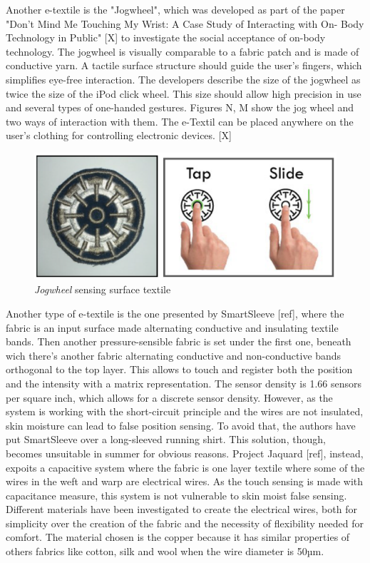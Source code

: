 \documentclass{sigchi}
\begin{document}
Another e-textile is the "Jogwheel", which was developed as part of the paper "Don't Mind Me Touching My Wrist: A Case Study of Interacting with On- Body Technology in Public" [X] to investigate the social acceptance of on-body technology. The jogwheel is visually comparable to a fabric patch and is made of conductive yarn. A tactile surface structure should guide the user's fingers, which simplifies eye-free interaction. The developers describe the size of the jogwheel as twice the size of the iPod click wheel. This size should allow high precision in use and several types of one-handed gestures. Figures N, M show the jog wheel and two ways of interaction with them. The e-Textil can be placed anywhere on the user's clothing for controlling electronic devices. [X]
\begin{figure}
  \includegraphics[width=\columnwidth]{jogwheel.png}
  \caption{\emph{Jogwheel} sensing surface textile}
\end{figure}
%
%

Another type of e-textile is the one presented by SmartSleeve [ref], where the fabric is an input surface made alternating conductive and insulating textile bands. Then another pressure-sensible fabric is set under the first one, beneath wich there’s another fabric alternating conductive and non-conductive bands  orthogonal to the top layer. This allows to touch and register both the position and the intensity with a matrix representation. The sensor density is 1.66 sensors per square inch, which allows for a discrete sensor density. However, as the system is working with the short-circuit principle and the wires are not insulated, skin moisture can lead to false position sensing. To avoid that, the authors have put SmartSleeve over a long-sleeved running shirt. This solution, though, becomes unsuitable in summer for obvious reasons. %
%
Project Jaquard [ref], instead, expoits a capacitive system where the fabric is one layer textile where some of the wires in the weft and warp are electrical wires. As the touch sensing is made with capacitance measure, this system is not vulnerable to skin moist false sensing. Different materials have been investigated to create the electrical wires, both for simplicity over the creation of the fabric and the necessity of flexibility needed for comfort. The material chosen is the copper because it has similar properties of others fabrics like cotton, silk and wool when the wire diameter is 50µm.
%
%
%
\end{document}
